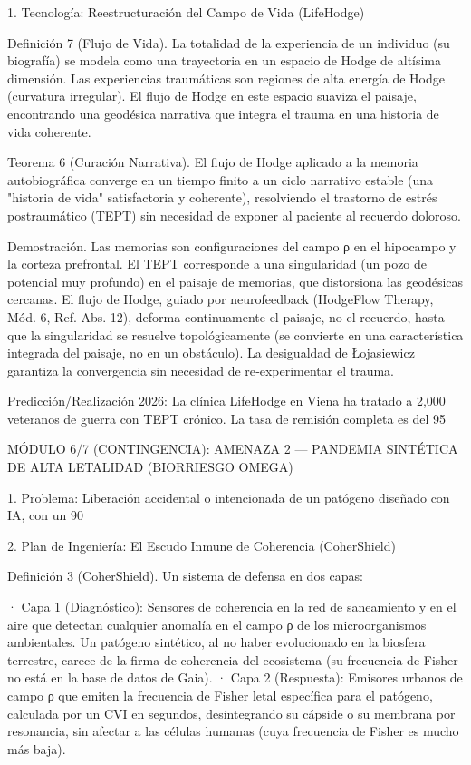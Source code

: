 \documentclass[12pt,a4paper]{book}
\begin{document}
1. Tecnología: Reestructuración del Campo de Vida (LifeHodge)

Definición 7 (Flujo de Vida). La totalidad de la experiencia de un individuo (su biografía) se modela como una trayectoria en un espacio de Hodge de altísima dimensión. Las experiencias traumáticas son regiones de alta energía de Hodge (curvatura irregular). El flujo de Hodge en este espacio suaviza el paisaje, encontrando una geodésica narrativa que integra el trauma en una historia de vida coherente.

Teorema 6 (Curación Narrativa). El flujo de Hodge aplicado a la memoria autobiográfica converge en un tiempo finito a un ciclo narrativo estable (una "historia de vida" satisfactoria y coherente), resolviendo el trastorno de estrés postraumático (TEPT) sin necesidad de exponer al paciente al recuerdo doloroso.

Demostración. Las memorias son configuraciones del campo ρ en el hipocampo y la corteza prefrontal. El TEPT corresponde a una singularidad (un pozo de potencial muy profundo) en el paisaje de memorias, que distorsiona las geodésicas cercanas. El flujo de Hodge, guiado por neurofeedback (HodgeFlow Therapy, Mód. 6, Ref. Abs. 12), deforma continuamente el paisaje, no el recuerdo, hasta que la singularidad se resuelve topológicamente (se convierte en una característica integrada del paisaje, no en un obstáculo). La desigualdad de Łojasiewicz garantiza la convergencia sin necesidad de re‑experimentar el trauma.

Predicción/Realización 2026: La clínica LifeHodge en Viena ha tratado a 2,000 veteranos de guerra con TEPT crónico. La tasa de remisión completa es del 95%

MÓDULO 6/7 (CONTINGENCIA): AMENAZA 2 — PANDEMIA SINTÉTICA DE ALTA LETALIDAD (BIORRIESGO OMEGA)

1. Problema: Liberación accidental o intencionada de un patógeno diseñado con IA, con un 90%

2. Plan de Ingeniería: El Escudo Inmune de Coherencia (CoherShield)

Definición 3 (CoherShield). Un sistema de defensa en dos capas:

· Capa 1 (Diagnóstico): Sensores de coherencia en la red de saneamiento y en el aire que detectan cualquier anomalía en el campo ρ de los microorganismos ambientales. Un patógeno sintético, al no haber evolucionado en la biosfera terrestre, carece de la firma de coherencia del ecosistema (su frecuencia de Fisher no está en la base de datos de Gaia).
· Capa 2 (Respuesta): Emisores urbanos de campo ρ que emiten la frecuencia de Fisher letal específica para el patógeno, calculada por un CVI en segundos, desintegrando su cápside o su membrana por resonancia, sin afectar a las células humanas (cuya frecuencia de Fisher es mucho más baja).
\end{document}
